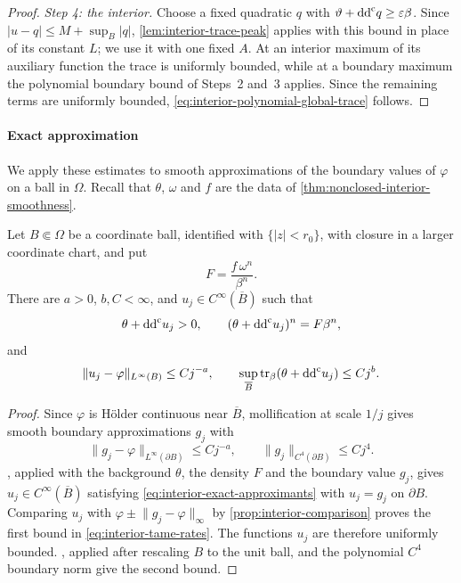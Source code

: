 \begin{proof}
\emph{Step 4: the interior.} Choose a fixed quadratic $q$ with $\vartheta+\mathrm{dd}^{\mathrm{c}} q\geq\varepsilon\beta$. Since $|u-q|\leq M+\sup_B|q|$, \cref{lem:interior-trace-peak} applies with this bound in place of its constant $L$; we use it with one fixed $A$. At an interior maximum of its auxiliary function the trace is uniformly bounded, while at a boundary maximum the polynomial boundary bound of Steps~2 and~3 applies. Since the remaining terms are uniformly bounded, \eqref{eq:interior-polynomial-global-trace} follows.
\end{proof}

\paragraph{Exact approximation}

We apply these estimates to smooth approximations of the boundary values of $\varphi$ on a ball in $\Omega$. Recall that $\theta$, $\omega$ and $f$ are the data of \cref{thm:nonclosed-interior-smoothness}.

\begin{proposition}\label{prop:interior-tame-approximants}
Let $B\Subset\Omega$ be a coordinate ball, identified with $\{|z|<r_0\}$, with closure in a larger coordinate chart, and put
\[
  F=\frac{f\,\omega^n}{\beta^n}.
\]
There are $a>0$, $b,C<\infty$, and $u_j\in C^\infty(\overline B)$ such that
\begin{equation}\label{eq:interior-exact-approximants}
  \theta+\mathrm{dd}^{\mathrm{c}} u_j>0,
  \qquad
  (\theta+\mathrm{dd}^{\mathrm{c}} u_j)^n=F\beta^n,
\end{equation}
and
\begin{equation}\label{eq:interior-tame-rates}
  \lVert u_j-\varphi\rVert_{L^\infty(B)}\leq Cj^{-a},
  \qquad
  \sup_{\overline B}\operatorname{tr}_\beta(\theta+\mathrm{dd}^{\mathrm{c}} u_j)\leq Cj^b.
\end{equation}
\end{proposition}

\begin{proof}
Since $\varphi$ is H\"older continuous near $\overline B$, mollification at scale $1/j$ gives smooth boundary approximations $g_j$ with
\[
  \lVert g_j-\varphi\rVert_{L^\infty(\partial B)}\leq Cj^{-a},
  \qquad
  \lVert g_j\rVert_{C^4(\partial B)}\leq Cj^4.
\]
, applied with the background $\theta$, the density $F$ and the boundary value $g_j$, gives $u_j\in C^\infty(\overline B)$ satisfying \eqref{eq:interior-exact-approximants} with $u_j=g_j$ on $\partial B$. Comparing $u_j$ with $\varphi\pm\lVert g_j-\varphi\rVert_\infty$ by \cref{prop:interior-comparison} proves the first bound in \eqref{eq:interior-tame-rates}. The functions $u_j$ are therefore uniformly bounded. , applied after rescaling $B$ to the unit ball, and the polynomial $C^4$ boundary norm give the second bound.
\end{proof}


